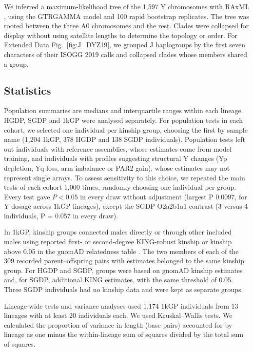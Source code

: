 We inferred a maximum-likelihood tree of the 1,597 Y chromosomes with RAxML \cite{Stamatakis2014}, using the GTRGAMMA model and 100 rapid bootstrap replicates. The tree was rooted between the three A0 chromosomes and the rest. Clades were collapsed for display without using satellite lengths to determine the topology or order. For Extended Data Fig.~\ref{fig:J_DYZ19}, we grouped J haplogroups by the first seven characters of their ISOGG 2019 calls and collapsed clades whose members shared a group.

\subsection{Statistics}\label{sec:m-stats}
Population summaries are medians and interquartile ranges within each lineage. HGDP, SGDP and 1kGP were analysed separately. For population tests in each cohort, we selected one individual per kinship group, choosing the first by sample name (1,204 1kGP, 378 HGDP and 138 SGDP individuals). Population tests left out individuals with reference assemblies, whose estimates come from model training, and individuals with profiles suggesting structural Y changes (Yp depletion, Yq loss, arm imbalance or PAR2 gain), whose estimates may not represent single arrays. To assess sensitivity to this choice, we repeated the main tests of each cohort 1,000 times, randomly choosing one individual per group. Every test gave $P < 0.05$ in every draw without adjustment (largest P 0.0097, for Y dosage across 1kGP lineages), except the SGDP O2a2b1a1 contrast (3 versus 4 individuals, P = 0.057 in every draw).

In 1kGP, kinship groups connected males directly or through other included males using reported first- or second-degree KING-robust kinship \cite{Manichaikul2010,Chang2015} or kinship above 0.05 in the gnomAD relatedness table \cite{Koenig2024}. The two members of each of the 309 recorded parent--offspring pairs with estimates belonged to the same kinship group. For HGDP and SGDP, groups were based on gnomAD kinship estimates and, for SGDP, additional KING estimates, with the same threshold of 0.05. Three SGDP individuals had no kinship data and were kept as separate groups.

Lineage-wide tests and variance analyses used 1,174 1kGP individuals from 13 lineages with at least 20 individuals each. We used Kruskal--Wallis tests. We calculated the proportion of variance in length (base pairs) accounted for by lineage as one minus the within-lineage sum of squares divided by the total sum of squares.

